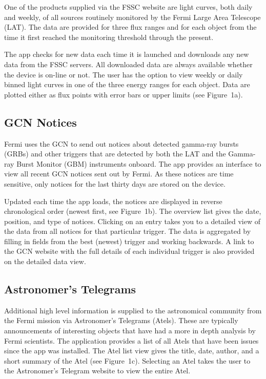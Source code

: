 One of the products supplied via the FSSC website are light curves, both daily and weekly, of all sources routinely monitored by the Fermi Large Area Telescope (LAT).  The data are provided for three flux ranges and for each object from the time it first reached the monitoring threshold through the present.

The app checks for new data each time it is launched and downloads any new data from the FSSC servers.  All downloaded data are always available whether the device is on-line or not.  The user has the option to view weekly or daily binned light curves in one of the three energy ranges for each object.  Data are plotted either as flux points with error bars or upper limits (see Figure~1a).

\subsection{GCN Notices}
Fermi uses the GCN to send out notices about detected gamma-ray bursts (GRBs) and other triggers that are detected by both the LAT and the Gamma-ray Burst Monitor (GBM) instruments onboard.  The app provides an interface to view all recent GCN notices sent out by Fermi.  As these notices are time sensitive, only notices for the last thirty days are stored on the device.

Updated each time the app loads, the notices are displayed in reverse chronological order (newest first, see Figure~1b).  The overview list gives the date, position, and type of notices.  Clicking on an entry takes you to a detailed view of the data from all notices for that particular trigger.  The data is aggregated by filling in fields from the best (newest) trigger and working backwards.  A link to the GCN website with the full details of each individual trigger is also provided on the detailed data view.

\subsection{Astronomer's Telegrams}
Additional high level information is supplied to the astronomical community from the Fermi mission via Astronomer's Telegrams (Atels).  These are typically announcements of interesting objects that have had a more in depth analysis by Fermi scientists.  The application provides a list of all Atels that have been issues since the app was installed.  The Atel list view gives the title, date, author, and a short summary of the Atel (see Figure~1c).  Selecting an Atel takes the user to the Astronomer's Telegram website to view the entire Atel.

